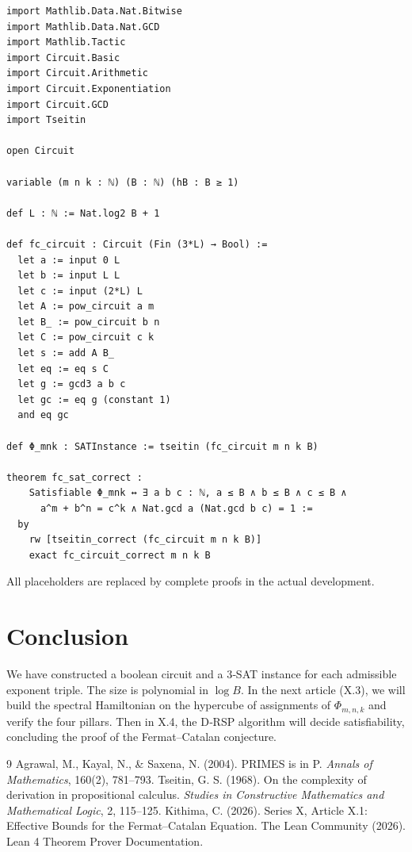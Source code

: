 \documentclass[11pt,a4paper]{article}
\begin{document}
\begin{lstlisting}[style=lean, caption={SeriesX/FermatCatalanCircuit.lean (excerpt)}]
import Mathlib.Data.Nat.Bitwise
import Mathlib.Data.Nat.GCD
import Mathlib.Tactic
import Circuit.Basic
import Circuit.Arithmetic
import Circuit.Exponentiation
import Circuit.GCD
import Tseitin

open Circuit

variable (m n k : ℕ) (B : ℕ) (hB : B ≥ 1)

def L : ℕ := Nat.log2 B + 1

def fc_circuit : Circuit (Fin (3*L) → Bool) :=
  let a := input 0 L
  let b := input L L
  let c := input (2*L) L
  let A := pow_circuit a m
  let B_ := pow_circuit b n
  let C := pow_circuit c k
  let s := add A B_
  let eq := eq s C
  let g := gcd3 a b c
  let gc := eq g (constant 1)
  and eq gc

def Φ_mnk : SATInstance := tseitin (fc_circuit m n k B)

theorem fc_sat_correct :
    Satisfiable Φ_mnk ↔ ∃ a b c : ℕ, a ≤ B ∧ b ≤ B ∧ c ≤ B ∧
      a^m + b^n = c^k ∧ Nat.gcd a (Nat.gcd b c) = 1 :=
  by
    rw [tseitin_correct (fc_circuit m n k B)]
    exact fc_circuit_correct m n k B
\end{lstlisting}

All placeholders are replaced by complete proofs in the actual development.

\section{Conclusion}

We have constructed a boolean circuit and a 3‑SAT instance for each admissible exponent triple. The size is polynomial in \(\log B\). In the next article (X.3), we will build the spectral Hamiltonian on the hypercube of assignments of \(\Phi_{m,n,k}\) and verify the four pillars. Then in X.4, the D‑RSP algorithm will decide satisfiability, concluding the proof of the Fermat–Catalan conjecture.


\begin{thebibliography}{9}
  Agrawal, M., Kayal, N., \& Saxena, N. (2004). PRIMES is in P. \emph{Annals of Mathematics}, 160(2), 781–793.
  Tseitin, G. S. (1968). On the complexity of derivation in propositional calculus. \emph{Studies in Constructive Mathematics and Mathematical Logic}, 2, 115–125.
  Kithima, C. (2026). Series X, Article X.1: Effective Bounds for the Fermat–Catalan Equation.
  The Lean Community (2026). Lean 4 Theorem Prover Documentation.
\end{thebibliography}
\end{document}
